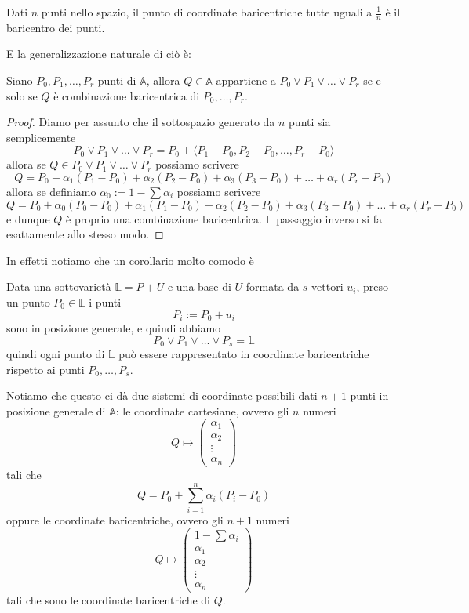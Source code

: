 \documentclass[11pt]{scrartcl}
\begin{document}
   	 \begin{example}
   	 	Dati $n$ punti nello spazio, il punto di coordinate baricentriche tutte uguali a $\frac{1}{n}$ è il baricentro dei punti.
   	 \end{example}
   	 E la generalizzazione naturale di ciò è:
   	 \begin{lemma}
   	 	Siano $P_0,P_1,\dots,P_r$ punti di $\mathbb{A}$, allora $Q\in \mathbb{A}$ appartiene a $P_0\lor P_1\lor\dots\lor P_r$ se e solo se $Q$ è combinazione baricentrica di $P_0,\dots,P_r$.
   	 \end{lemma}
   	 \begin{proof}
   	 	Diamo per assunto che il sottospazio generato da $n$ punti sia semplicemente
   	 	$$P_0\lor P_1\lor\dots\lor P_r=P_0+\langle P_1-P_0,P_2-P_0,\dots,P_r-P_0\rangle$$
   	 	allora se $Q\in P_0\lor P_1\lor\dots\lor P_r$ possiamo scrivere
   	 	$$Q=P_0+\alpha_1(P_1-P_0)+\alpha_2(P_2-P_0)+\alpha_3(P_3-P_0)+\dots+\alpha_r(P_r-P_0)$$
   	 	allora se definiamo $\alpha_0:=1-\sum \alpha_i$ possiamo scrivere
   	 	$$Q=P_0+\alpha_0(P_0-P_0)+\alpha_1(P_1-P_0)+\alpha_2(P_2-P_0)+\alpha_3(P_3-P_0)+\dots+\alpha_r(P_r-P_0)$$
   	 	e dunque $Q$ è proprio una combinazione baricentrica. Il passaggio inverso si fa esattamente allo stesso modo.
   	 \end{proof}
   	 In effetti notiamo che un corollario molto comodo è
   	 \begin{corollary}
   	 	Data una sottovarietà $\mathbb{L}=P+U$ e una base di $U$ formata da $s$ vettori $u_i$, preso un punto $P_0\in\mathbb{L}$ i punti 
   	 	$$P_i:=P_0+u_i$$
   	 	sono in posizione generale, e quindi abbiamo
   	 	$$P_0\lor P_1\lor\dots\lor P_s=\mathbb{L}$$
   	 	quindi ogni punto di $\mathbb{L}$ può essere rappresentato in coordinate baricentriche rispetto ai punti $P_0,\dots,P_s$.
   	 \end{corollary}
   	 Notiamo che questo ci dà due sistemi di coordinate possibili dati $n+1$ punti in posizione generale di $\mathbb{A}$: le coordinate cartesiane, ovvero gli $n$ numeri
   	 $$Q\mapsto \begin{pmatrix}
   	 	\alpha_1 \\
   	 	\alpha_2 \\
   	 	\vdots \\
   	 	\alpha_n
   	 \end{pmatrix}$$
   	 tali che 
   	 $$Q=P_0+\sum_{i=1}^{n}\alpha_i(P_i-P_0)$$
   	 oppure le coordinate baricentriche, ovvero gli $n+1$ numeri
   	 $$Q\mapsto \begin{pmatrix}
   	 	1-\sum\alpha_i \\
   	 	\alpha_1 \\
   	 	\alpha_2 \\
   	 	\vdots \\
   	 	\alpha_n
   	 \end{pmatrix}$$
   	 tali che sono le coordinate baricentriche di $Q$.
\end{document}
